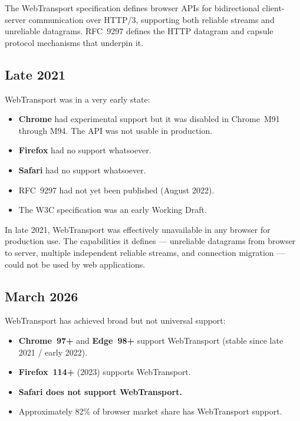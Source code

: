 \documentclass[11pt]{article}
\begin{document}
The WebTransport specification defines browser APIs for bidirectional
client-server communication over HTTP/3, supporting both reliable streams and
unreliable datagrams. RFC~9297 defines the HTTP datagram and capsule protocol
mechanisms that underpin it.

\subsection{Late 2021}

WebTransport was in a very early state:

\begin{itemize}
  \item \textbf{Chrome} had experimental support but it was disabled in
    Chrome~M91 through M94. The API was not usable in production.
  \item \textbf{Firefox} had no support whatsoever.
  \item \textbf{Safari} had no support whatsoever.
  \item RFC~9297 had not yet been published (August 2022).
  \item The W3C specification was an early Working Draft.
\end{itemize}

In late 2021, WebTransport was effectively unavailable in any browser for
production use. The capabilities it defines --- unreliable datagrams from
browser to server, multiple independent reliable streams, and connection
migration --- could not be used by web applications.

\subsection{March 2026}

WebTransport has achieved broad but not universal support:

\begin{itemize}
  \item \textbf{Chrome~97+} and \textbf{Edge~98+} support WebTransport
    (stable since late 2021 / early 2022).
  \item \textbf{Firefox~114+} (2023) supports WebTransport.
  \item \textbf{Safari does not support WebTransport.}
  \item Approximately 82\% of browser market share has WebTransport support.
\end{itemize}
\end{document}
